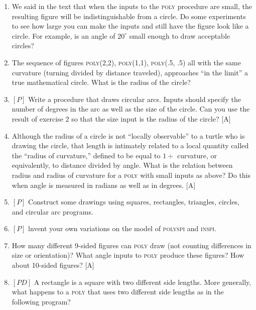 \documentclass{book}
\begin{document}
\begin{enumerate}
\item We said in the text that when the inputs to the \textsc{poly} 
procedure are small, the resulting figure will be indistinguishable from a circle. Do
some experiments to see how large you can make the inputs and still
have the figure look like a circle. For example, is an angle of $20^{\circ}$ 
small enough to draw acceptable circles?

\item The sequence of figures \textsc{poly(2,2)}, \textsc{poly(1,1)}, \textsc{poly(.5, .5)}
all with the same curvature (turning divided by distance traveled), approaches ``in the limit'' a true mathematical circle. What is the radius
of the circle?  
\item $[P]$ Write a procedure that draws circular arcs. Inputs should specify
the number of degrees in the arc as well as the size of the circle. Can
you use the result of exercise 2 so that the size input is the radius of the
circle? [A]
\item Although the radius of a circle is not ``locally observable'' to a turtle
who is drawing the circle, that length is intimately related to a local
quantity called the ``radius of curvature,'' defined to be equal to $1 \div$
curvature, or equivalently, to distance divided by angle. What is the
relation between radius and radius of curvature for a \textsc{poly} with small
inputs as above? Do this when angle is measured in radians as well as
in degrees. [A]
\item $[P]$ Construct some drawings using squares, rectangles, triangles,
circles, and circular arc programs.
\item $[P]$ lnvent your own variations on the model of \textsc{polyspi} and \textsc{inspi}.
\item How many different 9-sided figures can \textsc{poly} draw (not counting
differences in size or orientation)? What angle inputs to \textsc{poly} produce
these figures? How about 10-sided figures? [A]
\item $[PD]$ A rectangle is a square with two different side lengths. More
generally, what happens to a \textsc{poly} that uses two different side lengths
as in the following program?


\end{enumerate}
\end{document}
